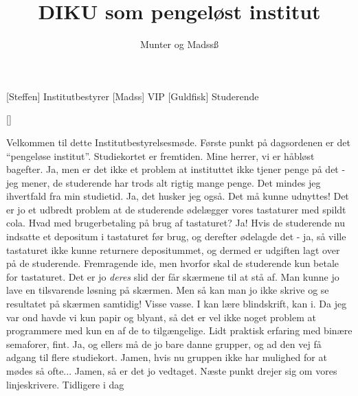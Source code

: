 \documentclass[a4paper,11pt]{article}
\title{DIKU som pengeløst institut}
\author{Munter og Madssß}
\begin{document}
\maketitle

\begin{roles}
[Steffen] Institutbestyrer
[Madss] VIP
[Guldfisk] Studerende
\end{roles}

\begin{props}
[]
\end{props}

  
\begin{sketch}


  Velkommen til dette Institutbestyrelsesmøde. Første punkt på
           dagsordenen er det ``pengeløse institut''. Studiekortet
            er fremtiden. Mine herrer,
           vi er håbløst bagefter.
 Ja, men er det ikke et problem at instituttet ikke tjener
           penge på det - jeg mener, de studerende har trods alt
           rigtig mange penge. Det mindes jeg ihvertfald fra min
           studietid.
  Ja, det husker jeg også. Det må kunne udnyttes!
           Det er jo et udbredt problem at de studerende ødelægger
           vores tastaturer med spildt cola. Hvad med brugerbetaling
           på brug af tastaturet?
 Ja! Hvis de studerende nu indsatte et depositum i
           tastaturet før brug, og derefter ødelagde det - ja, så
           ville tastaturet ikke kunne returnere depositummet, og
           dermed er udgiften lagt over på de studerende.
  Fremragende ide, men hvorfor skal de studerende kun betale
           for tastaturet. Det er jo {\em deres} slid der får skærmene
           til at stå af. 
 Man kunne jo lave en tilsvarende løsning på skærmen.
   Men så kan man jo ikke skrive og se resultatet på skærmen
           samtidig!
 Visse vasse. I kan lære blindskrift, kan i. Da jeg var ond
           havde vi kun papir og blyant, så det er vel ikke noget
           problem at programmere med kun en af de to tilgængelige.
           Lidt praktisk erfaring med binære semaforer, fint.
  Ja, og ellers må de jo bare danne grupper, og ad den vej få
           adgang til flere studiekort.
   Jamen, hvis nu gruppen ikke har mulighed for at mødes så
           ofte...
  Jamen, så er det jo vedtaget.
           Næste punkt drejer sig om vores linjeskrivere. Tidligere i dag

\end{sketch}
\end{document}
